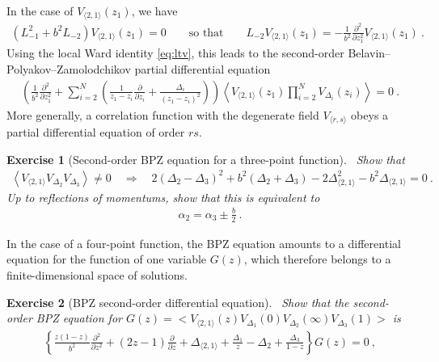 \documentclass[12pt, a4paper]{article}
\theoremstyle{break}
\newtheorem{exo}{Exercise}[section]
\begin{document}
In the case of $V_{\langle 2, 1 \rangle}(z_1)$, we have  
\begin{align}
\left(L_{-1}^2 + b^2 L_{-2}\right) V_{\langle 2, 1 \rangle}(z_1)  = 0\qquad \text{so that} \qquad L_{-2}V_{\langle 2, 1 \rangle}(z_1) = -\frac{1}{b^2}\frac{\partial^2}{\partial z_1^2} V_{\langle 2, 1 \rangle}(z_1)\ .
\end{align}
Using the local Ward identity \eqref{eq:ltv},
this leads to the second-order Belavin--Polyakov--Zamolodchikov partial differential equation
\begin{align}
 \left( \frac{1}{b^2}\frac{\partial^2}{\partial z_1^2} + \sum_{i=2}^N\left(\frac{1}{z_1-z_i}\frac{\partial}{\partial z_i} +\frac{\Delta_i}{(z_1-z_i)^2}\right) \right)\left< V_{\langle 2, 1 \rangle}(z_1) \prod_{i=2}^N V_{\Delta_i}(z_i) \right>  = 0\ .
 \label{eq:bpz}
\end{align}
More generally, a correlation function with the degenerate field $V_{\langle r,s\rangle}$ obeys a partial differential equation of order $rs$. 

\begin{exo}[Second-order BPZ equation for a three-point function]
 ~\label{exo:bpz3pt}
 Show that 
\begin{align}
 \left< V_{\langle 2, 1 \rangle} V_{\Delta_2} V_{\Delta_3} \right> \neq 0 \quad \Rightarrow \quad 
 2(\Delta_2-\Delta_3)^2 +b^2(\Delta_2+\Delta_3) -2\Delta_{\langle 2, 1 \rangle}^2 -b^2\Delta_{\langle 2, 1 \rangle} = 0\ .
 \end{align}
 Up to reflections of momentums, show that this is equivalent to
 \begin{align}
 \alpha_2 = \alpha_3 \pm \frac{b}{2}\ .
 \label{eq:alpm}
\end{align}
\end{exo}

In the case of a four-point function, the BPZ equation amounts to a differential equation for the function of one variable $G(z)$, which therefore belongs to a finite-dimensional space of solutions.

\begin{exo}[BPZ second-order differential equation]
 ~\label{exo:bpz}
 Show that the second-order BPZ equation for $G(z)=\Big< V_{\langle 2, 1 \rangle}(z) V_{\Delta_1}(0)V_{\Delta_2}(\infty)V_{\Delta_3}(1) \Big>$ is
 \begin{align}
  \left\{ \frac{z(1-z)}{b^2}\frac{\partial^2}{\partial z^2} + (2z-1){\frac{\partial}{\partial z}} +\Delta_{\langle 2,1 \rangle} +\frac{\Delta_1}{z}-\Delta_2 + \frac{\Delta_3}{1-z}\right\} G(z)=0\ ,
\label{eq:ode}
 \end{align}
\end{exo}
\end{document}
